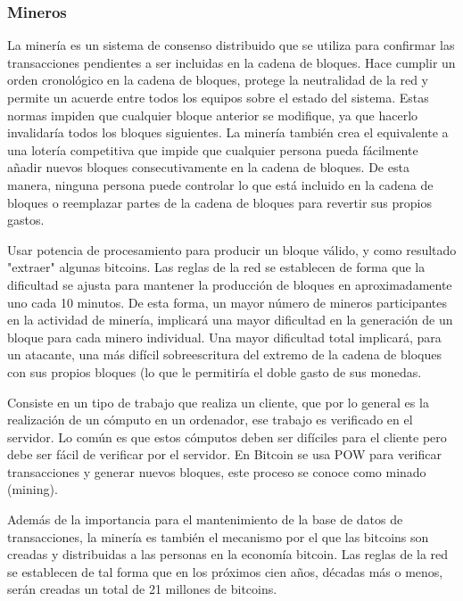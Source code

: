 \documentclass[12pt,letterpaper]{article}
\begin{document}
		\subsubsection*{Mineros}
		La miner\'ia es un sistema de consenso distribuido que se utiliza para confirmar las transacciones pendientes a ser incluidas en la cadena de bloques. Hace cumplir un orden cronol\'ogico en la cadena de bloques, protege la neutralidad de la red y permite un acuerde entre todos los equipos sobre el estado del sistema. 
		Estas normas impiden que cualquier bloque anterior se modifique, ya que hacerlo invalidar\'ia todos los bloques siguientes. La miner\'ia tambi\'en crea el equivalente a una loter\'ia competitiva que impide que cualquier persona pueda f\'acilmente añadir nuevos bloques consecutivamente en la cadena de bloques. 
		De esta manera, ninguna persona puede controlar lo que est\'a incluido en la cadena de bloques o reemplazar partes de la cadena de bloques para revertir sus propios gastos.
		
Usar potencia de procesamiento para producir un bloque v\'alido, y como resultado "extraer" algunas bitcoins. Las reglas de la red se establecen de forma que la dificultad se ajusta para mantener la producci\'on de bloques en aproximadamente uno cada 10 minutos. De esta forma, un mayor n\'umero de mineros participantes en la actividad de miner\'ia, implicar\'a una mayor dificultad en la generaci\'on de un bloque para cada minero individual. Una mayor dificultad total implicar\'a, para un atacante, una m\'as dif\'icil sobreescritura del extremo de la cadena de bloques con sus propios bloques (lo que le permitir\'ia el doble gasto de sus monedas.

Consiste en un tipo de trabajo que realiza un cliente, que por lo general es la realizaci\'on de un c\'omputo en un ordenador, ese trabajo es verificado en el servidor. Lo com\'un es que estos c\'omputos deben ser dif\'iciles para el cliente pero debe ser f\'acil de verificar por el servidor. En Bitcoin se usa POW para verificar transacciones y generar nuevos bloques, este proceso se conoce como minado (mining).

Adem\'as de la importancia para el mantenimiento de la base de datos de transacciones, la miner\'ia es tambi\'en el mecanismo por el que las bitcoins son creadas y distribuidas a las personas en la econom\'ia bitcoin. Las reglas de la red se establecen de tal forma que en los pr\'oximos cien años, d\'ecadas m\'as o menos, ser\'an creadas un total de 21 
millones de bitcoins. 
\end{document}

